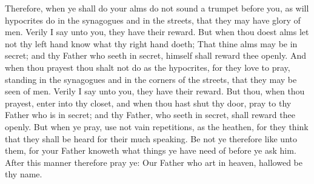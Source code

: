 \bverse \iffalse Therefore, when ye shall do your alms do not sound a trumpet before you, as will hypocrites do in the synagogues and in the streets, that they may have glory of men. Verily I say unto you, they have their reward. \fi
Therefore, when ye shall do your alms do not sound a trumpet before you, as will hypocrites do in the synagogues and in the streets, that they may have glory of men. Verily I say unto you, they have their reward.
\bverse \iffalse But when thou doest alms let not thy left hand know what thy right hand doeth; \fi
But when thou doest alms let not thy left hand know what thy right hand doeth;
\bverse \iffalse That thine alms may be in secret; and thy Father who seeth in secret, himself shall reward thee openly. \fi
That thine alms may be in secret; and thy Father who seeth in secret, himself shall reward thee openly.
\bverse \iffalse And when thou prayest thou shalt not do as the hypocrites, for they love to pray, standing in the synagogues and in the corners of the streets, that they may be seen of men. Verily I say unto you, they have their reward. \fi
And when thou prayest thou shalt not do as the hypocrites, for they love to pray, standing in the synagogues and in the corners of the streets, that they may be seen of men. Verily I say unto you, they have their reward.
\bverse \iffalse But thou, when thou prayest, enter into thy closet, and when thou hast shut thy door, pray to thy Father who is in secret; and thy Father, who seeth in secret, shall reward thee openly. \fi
But thou, when thou prayest, enter into thy closet, and when thou hast shut thy door, pray to thy Father who is in secret; and thy Father, who seeth in secret, shall reward thee openly.
\bverse \iffalse But when ye pray, use not vain repetitions, as the heathen, for they think that they shall be heard for their much speaking. \fi
But when ye pray, use not vain repetitions, as the heathen, for they think that they shall be heard for their much speaking.
\bverse \iffalse Be not ye therefore like unto them, for your Father knoweth what things ye have need of before ye ask him. \fi
Be not ye therefore like unto them, for your Father knoweth what things ye have need of before ye ask him.
\bverse \iffalse After this manner therefore pray ye: Our Father who art in heaven, hallowed be thy name. \fi
After this manner therefore pray ye: Our Father who art in heaven, hallowed be thy name.
\bverse \iffalse Thy will be done on earth as it is in heaven. \fi
